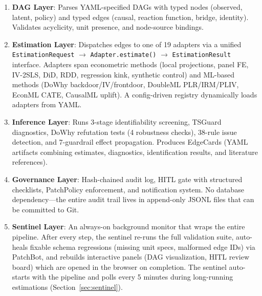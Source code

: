 \documentclass{article}
\begin{document}
\begin{enumerate}[leftmargin=*, itemsep=1pt]
    \item \textbf{DAG Layer}: Parses YAML-specified DAGs with typed nodes (observed, latent, policy) and typed edges (causal, reaction function, bridge, identity). Validates acyclicity, unit presence, and node-source bindings.

    \item \textbf{Estimation Layer}: Dispatches edges to one of 19 adapters via a unified \texttt{EstimationRequest} $\to$ \texttt{Adapter.estimate()} $\to$ \texttt{EstimationResult} interface. Adapters span econometric methods (local projections, panel FE, IV-2SLS, DiD, RDD, regression kink, synthetic control) and ML-based methods (DoWhy backdoor/IV/frontdoor, DoubleML PLR/IRM/PLIV, EconML CATE, CausalML uplift). A config-driven registry dynamically loads adapters from YAML.

    \item \textbf{Inference Layer}: Runs 3-stage identifiability screening, TSGuard diagnostics, DoWhy refutation tests (4 robustness checks), 38-rule issue detection, and 7-guardrail effect propagation. Produces EdgeCards (YAML artifacts combining estimates, diagnostics, identification results, and literature references).

    \item \textbf{Governance Layer}: Hash-chained audit log, HITL gate with structured checklists, PatchPolicy enforcement, and notification system. No database dependency---the entire audit trail lives in append-only JSONL files that can be committed to Git.

    \item \textbf{Sentinel Layer}: An always-on background monitor that wraps the entire pipeline. After every step, the sentinel re-runs the full validation suite, auto-heals fixable schema regressions (missing unit specs, malformed edge IDs) via PatchBot, and rebuilds interactive panels (DAG visualization, HITL review board) which are opened in the browser on completion. The sentinel auto-starts with the pipeline and polls every 5 minutes during long-running estimations (Section~\ref{sec:sentinel}).
\end{enumerate}
\end{document}
